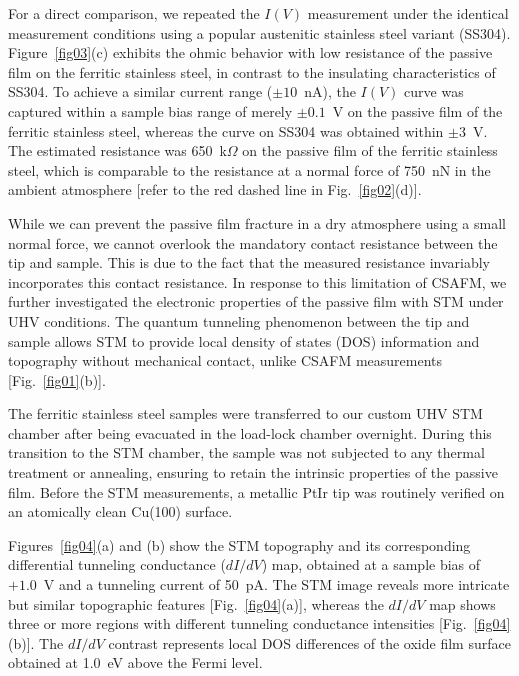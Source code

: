 \documentclass[jkps,reprint,twocolumn,showkeys]{revtex4}
\begin{document}
For a direct comparison, we repeated the $I(V)$ measurement under the identical measurement conditions using a popular austenitic stainless steel variant (SS304).
Figure~\ref{fig03}(c) exhibits the ohmic behavior with low resistance of the passive film on the ferritic stainless steel, in contrast to the insulating characteristics of SS304.
To achieve a similar current range ($\pm 10$~nA), the $I(V)$ curve was captured within a sample bias range of merely $\pm 0.1$~V on the passive film of the ferritic stainless steel, whereas the curve on SS304 was obtained within $\pm 3$~V.
The estimated resistance was 650~k$\Omega$ on the passive film of the ferritic stainless steel, which is comparable to the resistance at a normal force of 750~nN in the ambient atmosphere [refer to the red dashed line in Fig.~\ref{fig02}(d)].




While we can prevent the passive film fracture in a dry atmosphere using a small normal force, we cannot overlook the mandatory contact resistance between the tip and sample.
This is due to the fact that the measured resistance invariably incorporates this contact resistance.
In response to this limitation of CSAFM, we further investigated the electronic properties of the passive film with STM under UHV conditions.
The quantum tunneling phenomenon between the tip and sample allows STM to provide local density of states (DOS) information and topography without mechanical contact, unlike CSAFM measurements [Fig.~\ref{fig01}(b)].

The ferritic stainless steel samples were transferred to our custom UHV STM chamber after being evacuated in the load-lock chamber overnight.
During this transition to the STM chamber, the sample was not subjected to any thermal treatment or annealing, ensuring to retain the intrinsic properties of the passive film.
Before the STM measurements, a metallic PtIr tip was routinely verified on an atomically clean Cu(100) surface.


Figures~\ref{fig04}(a) and (b) show the STM topography and its corresponding differential tunneling conductance ($dI/dV$) map, obtained at a sample bias of $+1.0$~V  and a tunneling current of 50~pA.
The STM image reveals more intricate but similar topographic features [Fig.~\ref{fig04}(a)], 
whereas the $dI/dV$ map shows three or more regions with different tunneling conductance intensities [Fig.~\ref{fig04}(b)].
The $dI/dV$ contrast represents local DOS differences of the oxide film surface obtained at 1.0~eV above the Fermi level.
\end{document}
